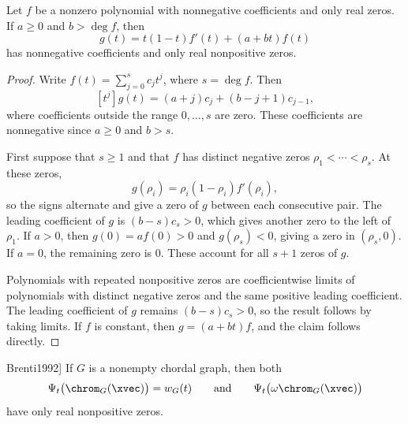 \begin{lemma}
Let $f$ be a nonzero polynomial with nonnegative coefficients and only real
zeros.  If $a\geq0$ and $b>\deg f$, then
\[
 g(t)=t(1-t)f'(t)+(a+bt)f(t)
\]
has nonnegative coefficients and only real nonpositive zeros.
\end{lemma}

\begin{proof}
Write $f(t)=\sum_{j=0}^s c_jt^j$, where $s=\deg f$.  Then
\[
 [t^j]g(t)=(a+j)c_j+(b-j+1)c_{j-1},
\]
where coefficients outside the range $0,\dotsc,s$ are zero.  These
coefficients are nonnegative since $a\geq0$ and $b>s$.

First suppose that $s\geq1$ and that $f$ has distinct negative zeros
$\rho_1<\dotsb<\rho_s$.  At these zeros,
\[
 g(\rho_i)=\rho_i(1-\rho_i)f'(\rho_i),
\]
so the signs alternate and give a zero of $g$ between each consecutive pair.
The leading coefficient of $g$ is $(b-s)c_s>0$, which gives another zero to
the left of $\rho_1$.  If $a>0$, then $g(0)=af(0)>0$ and
$g(\rho_s)<0$, giving a zero in $(\rho_s,0)$.  If $a=0$, the remaining zero
is $0$.  These account for all $s+1$ zeros of $g$.

Polynomials with repeated nonpositive zeros are coefficientwise limits of
polynomials with distinct negative zeros and the same positive leading
coefficient.  The leading coefficient of $g$ remains $(b-s)c_s>0$, so the
result follows by taking limits.  If $f$ is constant, then
$g=(a+bt)f$, and the claim follows directly.
\end{proof}

\begin{theorem}[Brenti, \cite[Thms.~4.11 and~4.15]{Brenti1992}]
If $G$ is a nonempty chordal graph, then both
\[
 \Psi_t\bigl(\chrom_G(\xvec)\bigr)=w_G(t)
 \qquad\text{and}\qquad
 \Psi_t\bigl(\omega\chrom_G(\xvec)\bigr)
\]
have only real nonpositive zeros.
\end{theorem}

